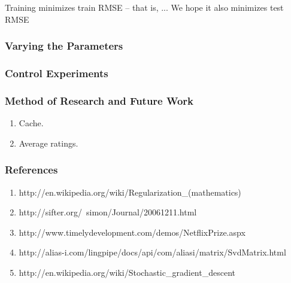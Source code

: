 \documentclass[12pt]{article}
\begin{document}
Training minimizes train RMSE -- that is, ...
We hope it also minimizes test RMSE

\subsubsection*{Varying the Parameters}

\subsubsection*{Control Experiments}

\subsubsection*{Method of Research and Future Work}
\begin{enumerate}
\item Cache.
\item Average ratings.
\end{enumerate}

\subsubsection*{References}
\begin{enumerate}
  \item http://en.wikipedia.org/wiki/Regularization\_(mathematics)
  \item http://sifter.org/~simon/Journal/20061211.html
  \item http://www.timelydevelopment.com/demos/NetflixPrize.aspx
  \item http://alias-i.com/lingpipe/docs/api/com/aliasi/matrix/SvdMatrix.html
  \item http://en.wikipedia.org/wiki/Stochastic\_gradient\_descent
\end{enumerate}
\end{document}
